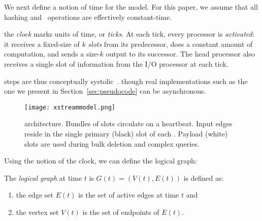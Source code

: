 We next define a notion of time for the \XStream model. For this paper, we 
assume that all hashing and \ufns \ operations are effectively constant-time.

\vspace*{2mm}
\noindent
\begin{definition} the \emph{\XStream clock} marks units of time, or \emph{ticks}. At each
tick, every processor is \emph{activated}: it receives a fixed-size \emph{\bundle}
of $k$ \emph{slots} from its predecessor, does a constant amount of
computation, and sends a size-$k$ output \bundle to its successor.
The head processor also receives a single slot of information from the I/O
processor at each tick.
\end{definition}

\XStream steps are thus conceptually systolic~\cite{kung1980algorithms}.
though real implementations such as the one we present in 
Section~\ref{sec:pseudocode} can be asynchronous.

\begin{figure}[htb]
\centerline{\texttt{[image: xstreammodel.png]}}
\caption{\label{AMP:fig:ringdiagram}\XStream architecture. Bundles of slots
circulate on a heartbeat. Input edges reside in the single primary (black) slot 
of each \bundlens. Payload (white) slots are used during bulk deletion and complex
queries.}
\end{figure}


\noindent
Using the notion of the \XStream clock, we can define the logical graph:
\begin{definition}
The {\em logical graph} at time $t$ is $G(t) = (V(t), E(t))$ is defined as:
\begin{enumerate}
\item the edge set $E(t)$ is the set of active edges at time $t$ and 
\item the vertex set $V(t)$ is the set of endpoints of $E(t)$.
\end{enumerate}
\end{definition}

